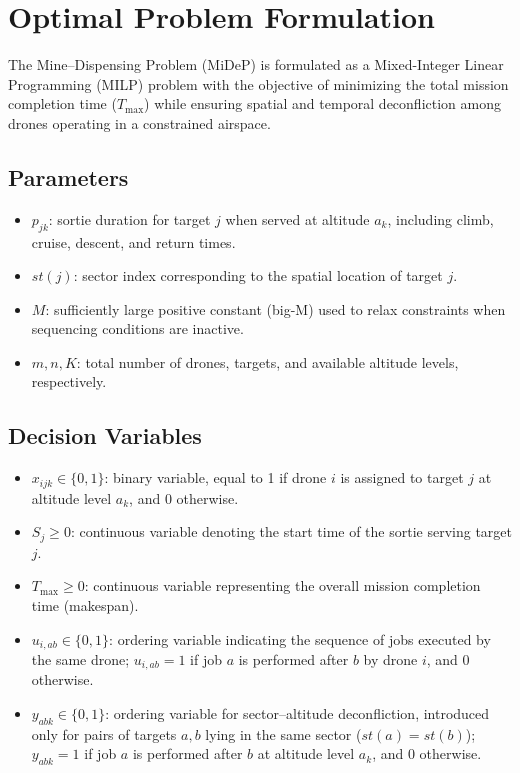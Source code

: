 \documentclass[subscriptcorrection,upint,nolists, varvw,barcolor=Goldenrod3,mathalfa=cal=euler,balance,hyphenate,french]{asmejour} %
\begin{document}
\section{Optimal Problem Formulation}
\label{sec:optform}

The Mine–Dispensing Problem (MiDeP) is formulated as a Mixed-Integer Linear Programming (MILP) problem with the objective of minimizing the total mission completion time (\(T_{\max}\)) while ensuring spatial and temporal deconfliction among drones operating in a constrained airspace.

\subsection{Parameters}
\begin{itemize}
    \item \(p_{jk}\): sortie duration for target \(j\) when served at altitude \(a_k\), including climb, cruise, descent, and return times. 
    \item \(st(j)\): sector index corresponding to the spatial location of target \(j\).
    \item \(M\): sufficiently large positive constant (big-M) used to relax constraints when sequencing conditions are inactive.
    \item \(m, n, K\): total number of drones, targets, and available altitude levels, respectively.
\end{itemize}


\subsection{Decision Variables}
\begin{itemize}
    \item \(x_{ijk} \in \{0,1\}\): binary variable, equal to 1 if drone \(i\) is assigned to target \(j\) at altitude level \(a_k\), and 0 otherwise.
    \item \(S_j \ge 0\): continuous variable denoting the start time of the sortie serving target \(j\).
    \item \(T_{\max} \ge 0\): continuous variable representing the overall mission completion time (makespan).
    \item \(u_{i,ab} \in \{0,1\}\): ordering variable indicating the sequence of jobs executed by the same drone; \(u_{i,ab}=1\) if job \(a\) is performed after \(b\) by drone \(i\), and \(0\) otherwise.
    \item \(y_{abk} \in \{0,1\}\): ordering variable for sector--altitude deconfliction, introduced only for pairs of targets \(a,b\) lying in the same sector (\(st(a)=st(b)\)); \(y_{abk}=1\) if job \(a\) is performed after \(b\) at altitude level \(a_k\), and \(0\) otherwise.
\end{itemize}
\end{document}
